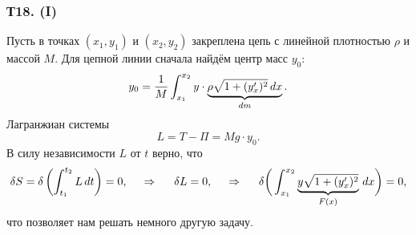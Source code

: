 \subsubsection*{Т18. (I)}

Пусть в точках $(x_1, y_1)$ и $(x_2, y_2)$ закреплена цепь с линейной плотностью $\rho$ и массой $M$.
Для цепной линии сначала найдём центр масс $y_0$:
\begin{equation*}
    y_0 = \frac{1}{M} \int_{x_1}^{x_2}
    y \cdot 
    \underbrace{
    \rho \sqrt{1 + (y_x')^2} \, d x
    }_{
    dm
    }.
\end{equation*}
Лагранжиан системы
\begin{equation*}
    L = T - \Pi = M g \cdot y_0.
\end{equation*}
В силу независимости $L$ от $t$ верно, что
\begin{equation}
    \delta S = \delta 
    \left(\int_{t_1}^{t_2} L \, d t\right)
    = 0,
    \hspace{0.5cm} \Rightarrow \hspace{0.5cm} 
    \delta L = 0, \hspace{0.5cm} \Rightarrow \hspace{0.5cm}
    \delta
    \bigg(
    \int_{x_1}^{x_2}
    \underbrace{
    y \sqrt{1 + (y_x')^2}
    }_{
    F(x)
    } \, d x
    \bigg) = 0
    ,
\end{equation}
что позволяет нам решать немного другую задачу.

